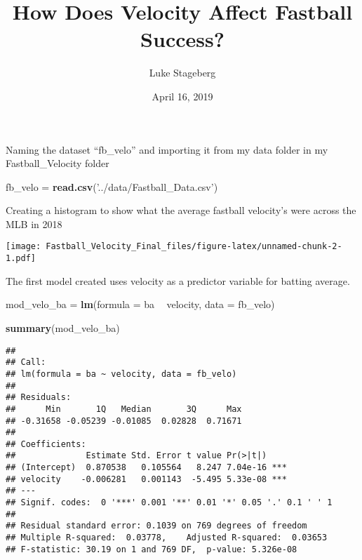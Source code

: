\documentclass[]{article}
\title{How Does Velocity Affect Fastball Success?}
\author{Luke Stageberg}
\date{April 16, 2019}
\newenvironment{Shaded}{\begin{snugshade}}{\end{snugshade}}
\newcommand{\KeywordTok}[1]{\textcolor[rgb]{0.13,0.29,0.53}{\textbf{#1}}}
\newcommand{\DataTypeTok}[1]{\textcolor[rgb]{0.13,0.29,0.53}{#1}}
\newcommand{\DecValTok}[1]{\textcolor[rgb]{0.00,0.00,0.81}{#1}}
\newcommand{\StringTok}[1]{\textcolor[rgb]{0.31,0.60,0.02}{#1}}
\newcommand{\OperatorTok}[1]{\textcolor[rgb]{0.81,0.36,0.00}{\textbf{#1}}}
\newcommand{\NormalTok}[1]{#1}
\begin{document}
\maketitle

Naming the dataset ``fb\_velo'' and importing it from my data folder in
my Fastball\_Velocity folder

\begin{Shaded}
\begin{Highlighting}[]
\NormalTok{fb_velo =}\StringTok{ }\KeywordTok{read.csv}\NormalTok{(}\StringTok{'../data/Fastball_Data.csv'}\NormalTok{)}
\end{Highlighting}
\end{Shaded}

Creating a histogram to show what the average fastball velocity's were
across the MLB in 2018

\begin{Shaded}
\end{Shaded}

\texttt{[image: Fastball\_Velocity\_Final\_files/figure-latex/unnamed-chunk-2-1.pdf]}

The first model created uses velocity as a predictor variable for
batting average.

\begin{Shaded}
\begin{Highlighting}[]
\NormalTok{mod_velo_ba =}\StringTok{ }\KeywordTok{lm}\NormalTok{(}\DataTypeTok{formula =}\NormalTok{ ba }\OperatorTok{~}\StringTok{ }\NormalTok{velocity, }\DataTypeTok{data =}\NormalTok{ fb_velo)}
\end{Highlighting}
\end{Shaded}

\begin{Shaded}
\begin{Highlighting}[]
\KeywordTok{summary}\NormalTok{(mod_velo_ba)}
\end{Highlighting}
\end{Shaded}

\begin{verbatim}
## 
## Call:
## lm(formula = ba ~ velocity, data = fb_velo)
## 
## Residuals:
##      Min       1Q   Median       3Q      Max 
## -0.31658 -0.05239 -0.01085  0.02828  0.71671 
## 
## Coefficients:
##              Estimate Std. Error t value Pr(>|t|)    
## (Intercept)  0.870538   0.105564   8.247 7.04e-16 ***
## velocity    -0.006281   0.001143  -5.495 5.33e-08 ***
## ---
## Signif. codes:  0 '***' 0.001 '**' 0.01 '*' 0.05 '.' 0.1 ' ' 1
## 
## Residual standard error: 0.1039 on 769 degrees of freedom
## Multiple R-squared:  0.03778,    Adjusted R-squared:  0.03653 
## F-statistic: 30.19 on 1 and 769 DF,  p-value: 5.326e-08
\end{verbatim}
\end{document}
